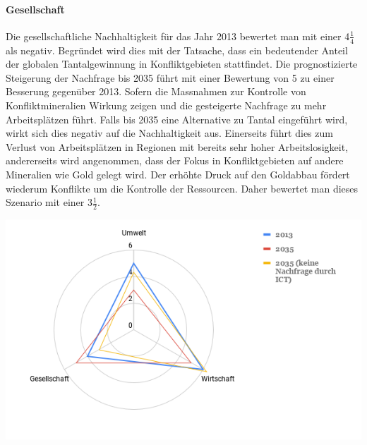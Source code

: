 \paragraph{Gesellschaft}
Die gesellschaftliche Nachhaltigkeit für das Jahr 2013 bewertet man mit einer 4\(\frac{1}{4}\) 
als negativ. Begründet wird dies mit der Tatsache, dass ein bedeutender Anteil 
der globalen Tantalgewinnung in Konfliktgebieten stattfindet. Die prognostizierte 
Steigerung der Nachfrage bis 2035 führt mit einer Bewertung von 5 zu einer 
Besserung gegenüber 2013. Sofern die Massnahmen zur Kontrolle von Konfliktmineralien 
Wirkung zeigen und die gesteigerte Nachfrage zu mehr Arbeitsplätzen führt. Falls bis
2035 eine Alternative zu Tantal eingeführt wird, wirkt sich dies negativ auf die 
Nachhaltigkeit aus. Einerseits führt dies zum Verlust von Arbeitsplätzen in Regionen
mit bereits sehr hoher Arbeitslosigkeit, andererseits wird angenommen, dass der 
Fokus in Konfliktgebieten auf andere Mineralien wie Gold gelegt wird. Der erhöhte Druck
auf den Goldabbau fördert wiederum Konflikte um die Kontrolle der Ressourcen. Daher 
bewertet man dieses Szenario mit einer 3\(\frac{1}{2}\).


\begin{center}
\includegraphics[width=14cm]{images/tantal-results}
\end{center}
